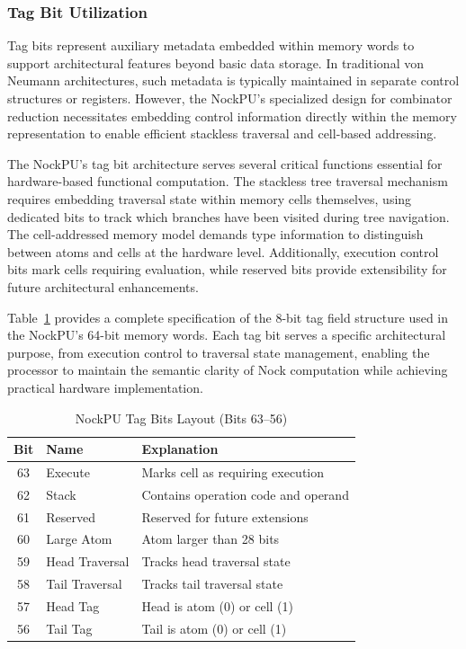 \documentclass[twoside]{article}
\begin{document}
\subsubsection{Tag Bit Utilization}

Tag bits represent auxiliary metadata embedded within memory words to support architectural features beyond basic data storage. In traditional von Neumann architectures, such metadata is typically maintained in separate control structures or registers. However, the NockPU's specialized design for combinator reduction necessitates embedding control information directly within the memory representation to enable efficient stackless traversal and cell-based addressing.

The NockPU's tag bit architecture serves several critical functions essential for hardware-based functional computation. The stackless tree traversal mechanism requires embedding traversal state within memory cells themselves, using dedicated bits to track which branches have been visited during tree navigation. The cell-addressed memory model demands type information to distinguish between atoms and cells at the hardware level. Additionally, execution control bits mark cells requiring evaluation, while reserved bits provide extensibility for future architectural enhancements.

Table~\ref{tab:tag-bits} provides a complete specification of the 8-bit tag field structure used in the NockPU's 64-bit memory words. Each tag bit serves a specific architectural purpose, from execution control to traversal state management, enabling the processor to maintain the semantic clarity of Nock computation while achieving practical hardware implementation.

\begin{table}[h]
\centering
\caption{NockPU Tag Bits Layout (Bits 63--56)}
\label{tab:tag-bits}
\begin{tabular}{|c|l|p{6cm}|}
\hline
\textbf{Bit} & \textbf{Name} & \textbf{Explanation} \\
\hline
63 & Execute & Marks cell as requiring execution \\
62 & Stack & Contains operation code and operand \\
61 & Reserved & Reserved for future extensions \\
60 & Large Atom & Atom larger than 28 bits \\
59 & Head Traversal & Tracks head traversal state \\
58 & Tail Traversal & Tracks tail traversal state \\
57 & Head Tag & Head is atom (0) or cell (1) \\
56 & Tail Tag & Tail is atom (0) or cell (1) \\
\hline
\end{tabular}
\end{table}
\end{document}
